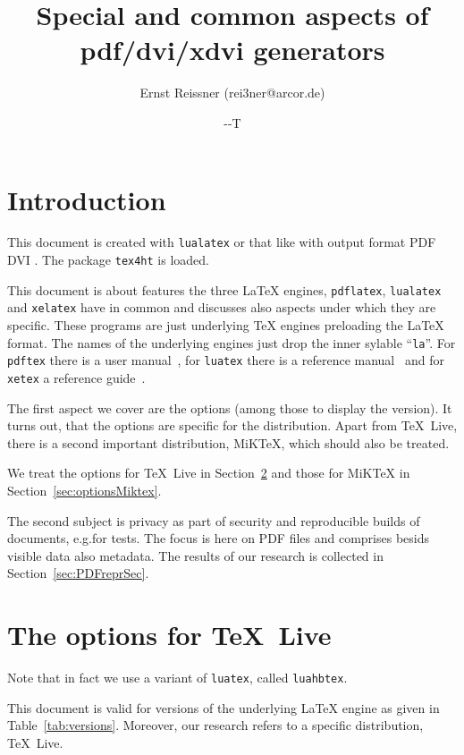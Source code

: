 \documentclass[a4paper, english]{article}%
\title{Special and common aspects of pdf/dvi/xdvi generators }
\author{Ernst Reissner (rei3ner@arcor.de)}
\date{\the\year-\the\month-\the\day T\printtime}%
\newcommand{\pdflatex}{\texttt{pdflatex}}
\newcommand{\lualatex}{\texttt{lualatex}}
\newcommand{\xelatex}{\texttt{xelatex}}
\newcommand{\texlive}{\TeX~Live}
\newcommand{\miktex}{MiKTeX}
\begin{document}
\maketitle
\tableofcontents
\listoftables
\lstlistoflistings%

\section{Introduction}

This document is created with \lualatex{} or that like 
with output format 
\ifpdf%
PDF%
\else
DVI%
\fi.
The package \texttt{tex4ht} 
is  loaded. 

This document is about features the three \LaTeX{} engines, 
\pdflatex, \lualatex{} and \xelatex{} have in common 
and discusses also aspects under which they are specific. 
These programs are just underlying \TeX{} engines preloading the \LaTeX{} format. 
The names of the underlying engines just drop the inner sylable ``\texttt{la}''. 
For \texttt{pdftex} there is a user manual~\cite{PdfTexUsr24}, 
for \texttt{luatex} there is a reference manual~\cite{LuaTexRef24} and 
for \texttt{xetex} a reference guide~\cite{XeTexRef24}. 

The first aspect we cover are the options (among those to display the version). 
It turns out, that the options are specific for the distribution. 
Apart from \texlive{}, there is a second important distribution, \miktex, 
which should also be treated. 

We treat the options for \texlive{} in Section~\ref{sec:optionsTexlive} 
and those for \miktex{} in Section~\ref{sec:optionsMiktex}. 

The second subject is privacy as part of security 
and reproducible builds of documents, e.g.\@ for tests. 
The focus is here on PDF files and comprises besids visible data 
also metadata. 
The results of our research is collected in Section~\ref{sec:PDFreprSec}. 

\section{The options for \texlive}\label{sec:optionsTexlive}


Note that in fact we use a variant of \texttt{luatex}, called \texttt{luahbtex}. 

This document is valid for versions of the underlying \LaTeX{} engine 
as given in Table~\ref{tab:versions}. 
Moreover, our research refers to a specific distribution, \texlive. 
\end{document}
